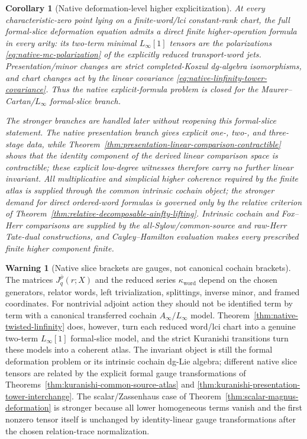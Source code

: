 \documentclass[11pt]{article}
\newtheorem{corollary}[theorem]{Corollary}
\theoremstyle{definition}
\newtheorem{warning}[theorem]{Warning}
\begin{document}
\begin{corollary}[Native deformation-level higher explicitization]\label{cor:native-deformation-explicitization}
At every characteristic-zero point lying on a finite-word/lci constant-rank
chart, the full formal-slice deformation equation admits a direct finite
higher-operation formula in every arity: its two-term minimal
$L_\infty[1]$ tensors are the polarizations
\eqref{eq:native-mc-polarization} of the explicitly reduced transport-word
jets.  Presentation/minor changes are strict completed-Koszul dg-algebra
isomorphisms, and chart changes act by the linear covariance
\eqref{eq:native-linfinity-tower-covariance}.  Thus the native explicit-formula
problem is closed for the Maurer--Cartan/$L_\infty$ formal-slice branch.

The stronger branches are handled later without reopening this formal-slice
statement.  The native presentation branch gives explicit one-, two-, and
three-stage data, while Theorem~\ref{thm:presentation-linear-comparison-contractible}
shows that the identity component of the derived linear comparison space is contractible; these explicit low-degree witnesses therefore carry no further linear invariant.
All multiplicative and simplicial higher coherence required by the finite atlas
is supplied through the common intrinsic cochain object; the stronger demand for
direct ordered-word formulas is governed only by the relative criterion of
Theorem~\ref{thm:relative-decomposable-ainfty-lifting}.  Intrinsic cochain and
Fox--Herr comparisons are supplied by the all-Sylow/common-source and raw-Herr
Tate-dual constructions, and Cayley--Hamilton evaluation makes every prescribed
finite higher component finite.
\end{corollary}

\begin{warning}[Native slice brackets are gauges, not canonical cochain brackets]\label{warn:word-jets-not-higher-brackets}
The matrices $J_q^{\bar\rho}(r;X)$ and the reduced series
$\kappa_{\mathrm{word}}$ depend on the chosen generators, relator words,
left trivialization, splittings, inverse minor, and framed coordinates.  For
nontrivial adjoint action they should not be identified term by term with a
canonical transferred cochain $A_\infty/L_\infty$ model.  Theorem~\ref{thm:native-twisted-linfinity}
does, however, turn each reduced word/lci chart into a genuine two-term
$L_\infty[1]$ formal-slice model, and the strict Kuranishi transitions turn
these models into a coherent atlas.  The invariant object is still the
formal deformation problem or its intrinsic cochain dg-Lie algebra; different
native slice tensors are related by the explicit formal gauge transformations
of Theorems~\ref{thm:kuranishi-common-source-atlas} and
\ref{thm:kuranishi-presentation-tower-interchange}.  The scalar/Zassenhaus
case of Theorem~\ref{thm:scalar-magnus-deformation} is stronger because all
lower homogeneous terms vanish and the first nonzero tensor itself is
unchanged by identity-linear gauge transformations after the chosen
relation-trace normalization.
\end{warning}
\end{document}
